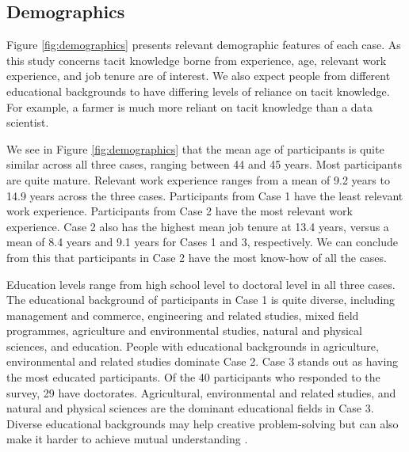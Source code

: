 \subsection{Demographics}

Figure \ref{fig:demographics} presents relevant demographic features of each case. As this study concerns tacit knowledge borne from experience, age, relevant work experience, and job tenure are of interest. We also expect people from different educational backgrounds to have differing levels of reliance on tacit knowledge. For example, a farmer is much more reliant on tacit knowledge than a data scientist. \medskip

We see in Figure \ref{fig:demographics} that the mean age of participants is quite similar across all three cases, ranging between 44 and 45 years. Most participants are quite mature. Relevant work experience ranges from a mean of 9.2 years to 14.9 years across the three cases. Participants from Case 1 have the least relevant work experience. Participants from Case 2 have the most relevant work experience. Case 2 also has the highest mean job tenure at 13.4 years, versus a mean of 8.4 years and 9.1 years for Cases 1 and 3, respectively. We can conclude from this that participants in Case 2 have the most know-how of all the cases. \medskip

Education levels range from high school level to doctoral level in all three cases. The educational background of participants in Case 1 is quite diverse, including management and commerce, engineering and related studies, mixed field programmes, agriculture and environmental studies, natural and physical sciences, and education. People with educational backgrounds in agriculture, environmental and related studies dominate Case 2. Case 3 stands out as having the most educated participants. Of the 40 participants who responded to the survey, 29 have doctorates. Agricultural, environmental and related studies, and natural and physical sciences are the dominant educational fields in Case 3. Diverse educational backgrounds may help creative problem-solving but can also make it harder to achieve mutual understanding \citep{mors2010innovation,jen2014social}.

